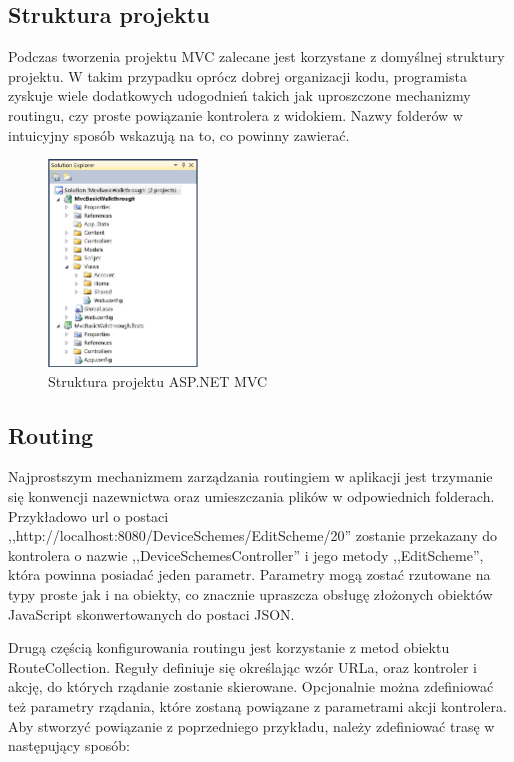 \subsection{Struktura projektu}
Podczas tworzenia projektu MVC zalecane jest korzystane z domyślnej struktury projektu. W takim przypadku oprócz dobrej organizacji kodu, programista zyskuje wiele dodatkowych udogodnień takich jak uproszczone mechanizmy routingu, czy proste powiązanie kontrolera z widokiem. Nazwy folderów w intuicyjny sposób wskazują na to, co powinny zawierać. 

\begin{figure}[h]
	\includegraphics[height=55mm]{./img/mvc-project-structure.png}
	\caption{Struktura projektu ASP.NET MVC}
	\label{fig:mvc-project-structure}
\end{figure}

\subsection{Routing}
Najprostszym mechanizmem zarządzania routingiem w aplikacji jest trzymanie się konwencji nazewnictwa oraz umieszczania plików w odpowiednich folderach. Przykładowo url o postaci ,,http://localhost:8080/DeviceSchemes/EditScheme/20'' zostanie przekazany do kontrolera o nazwie ,,DeviceSchemesController'' i jego metody ,,EditScheme'', która powinna posiadać jeden parametr. Parametry mogą zostać rzutowane na typy proste jak i na obiekty, co znacznie upraszcza obsługę złożonych obiektów JavaScript skonwertowanych do postaci JSON. 

Drugą częścią konfigurowania routingu jest korzystanie z metod obiektu RouteCollection. Reguły definiuje się określając wzór URLa, oraz kontroler i akcję, do których rządanie zostanie skierowane. Opcjonalnie można zdefiniować też parametry rządania, które zostaną powiązane z parametrami akcji kontrolera. Aby stworzyć powiązanie z poprzedniego przykładu, należy zdefiniować trasę w następujący sposób:

